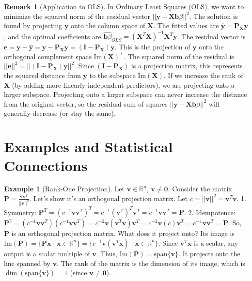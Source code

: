 \documentclass[12pt, letterpaper]{article}
\theoremstyle{definition}
\newtheorem{example}{Example}[section]
\newtheorem{remark}{Remark}[section]
\newcommand{\R}{\mathbb{R}}
\newcommand{\mat}[1]{\mathbf{#1}} %
\newcommand{\vect}[1]{\mathbf{#1}} %
\newcommand{\x}{\vect{x}} %
\newcommand{\y}{\vect{y}} %
\newcommand{\bvec}{\vect{b}} %
\newcommand{\im}{\text{Im}}
\newcommand{\Span}{\text{span}}
\begin{document}
\begin{remark}[Application to OLS]
In Ordinary Least Squares (OLS), we want to minimize the squared norm of the residual vector $||\y - \mat{X}\bvec{\beta}||^2$. The solution is found by projecting $\y$ onto the column space of $\mat{X}$. The fitted values are $\hat{\y} = \mat{P}_\mat{X}\y$, and the optimal coefficients are $\hat{\bvec{\beta}}_{OLS} = (\mat{X}^T \mat{X})^{-1} \mat{X}^T \y$.
The residual vector is $\vect{e} = \y - \hat{\y} = \y - \mat{P}_\mat{X}\y = (\mat{I} - \mat{P}_\mat{X})\y$. This is the projection of $\y$ onto the orthogonal complement space $\im(\mat{X})^\perp$.
The squared norm of the residual is $||\vect{e}||^2 = ||(\mat{I} - \mat{P}_\mat{X})\y||^2$. Since $(\mat{I} - \mat{P}_\mat{X})$ is a projection matrix, this represents the squared distance from $\y$ to the subspace $\im(\mat{X})$.
If we increase the rank of $\mat{X}$ (by adding more linearly independent predictors), we are projecting onto a larger subspace. Projecting onto a larger subspace can never increase the distance from the original vector, so the residual sum of squares $||\y - \mat{X}\bvec{\beta}||^2$ will generally decrease (or stay the same).
\end{remark}

\section{Examples and Statistical Connections}

\begin{example}[Rank-One Projection]
Let $\vect{v} \in \R^n$, $\vect{v} \ne \vect{0}$. Consider the matrix $\mat{P} = \frac{\vect{v}\vect{v}^T}{||\vect{v}||^2}$.
Let's show it's an orthogonal projection matrix. Let $c = ||\vect{v}||^2 = \vect{v}^T\vect{v}$.
1. Symmetry: $\mat{P}^T = (c^{-1} \vect{v}\vect{v}^T)^T = c^{-1} (\vect{v}^T)^T \vect{v}^T = c^{-1} \vect{v}\vect{v}^T = \mat{P}$.
2. Idempotence: $\mat{P}^2 = (c^{-1} \vect{v}\vect{v}^T)(c^{-1} \vect{v}\vect{v}^T) = c^{-2} \vect{v}(\vect{v}^T\vect{v})\vect{v}^T = c^{-2} \vect{v}(c)\vect{v}^T = c^{-1} \vect{v}\vect{v}^T = \mat{P}$.
So, $\mat{P}$ is an orthogonal projection matrix. What does it project onto? Its image is $\im(\mat{P}) = \{ \mat{P}\x \mid \x \in \R^n \} = \{ c^{-1}\vect{v}(\vect{v}^T\x) \mid \x \in \R^n \}$. Since $\vect{v}^T\x$ is a scalar, any output is a scalar multiple of $\vect{v}$. Thus, $\im(\mat{P}) = \Span\{\vect{v}\}$. It projects onto the line spanned by $\vect{v}$.
The rank of the matrix is the dimension of its image, which is $\dim(\Span\{\vect{v}\}) = 1$ (since $\vect{v} \ne \vect{0}$).
\end{example}
\end{document}
